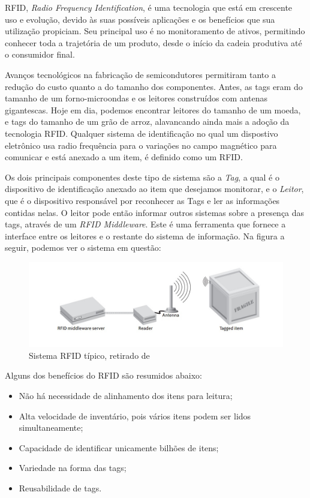 \documentclass[a4paper,12pt,titlepage]{article}
\begin{document}
	
	RFID, \textit{Radio Frequency Identification}, é uma tecnologia que está em crescente uso e evolução, devido às suas possíveis aplicações e os benefícios que sua utilização propiciam. Seu principal uso é no monitoramento de ativos, permitindo conhecer toda a trajetória de um produto, desde o início da cadeia produtiva até o consumidor final. 
	
	Avanços tecnológicos na fabricação de semicondutores permitiram tanto a redução do custo quanto a do tamanho dos componentes. Antes, as tags eram do tamanho de um forno-microondas e os leitores construídos com antenas gigantescas. Hoje em dia, podemos encontrar leitores do tamanho de um moeda, e tags do tamanho de um grão de arroz, alavancando ainda mais a adoção da tecnologia RFID. Qualquer sistema de identificação no qual um dispostivo eletrônico usa radio frequência para o variações no campo magnético para comunicar e está anexado a um item, é definido como um RFID.
	
	Os dois principais componentes deste tipo de sistema são a \textit{Tag}, a qual é o dispositivo de identificação anexado ao item que desejamos monitorar, e o \textit{Leitor}, que é o dispositivo responsável por reconhecer as Tags e ler as informações contidas nelas. O leitor pode então informar outros sistemas sobre a presença das tags, através de um \textit{RFID Middleware}. Este é uma ferramenta que fornece a interface entre os leitores e o restante do sistema de informação. Na figura a seguir, podemos ver o sistema em questão:
	
	\begin{figure}[h!]
		\centering
		\includegraphics[width=0.6\linewidth]{rfidsys2}
		\caption{Sistema RFID típico, retirado de \cite{rfidbook}}
		\label{fig:rfidsys}
	\end{figure}
	
	Alguns dos benefícios do RFID são resumidos abaixo:
	\begin{itemize}
		\item Não há necessidade de alinhamento dos itens para leitura;
		\item Alta velocidade de inventário, pois vários itens podem ser lidos simultaneamente;
		\item Capacidade de identificar unicamente bilhões de itens;
		\item Variedade na forma das tags;
		\item Reusabilidade de tags.
	\end{itemize}
	
\end{document}
